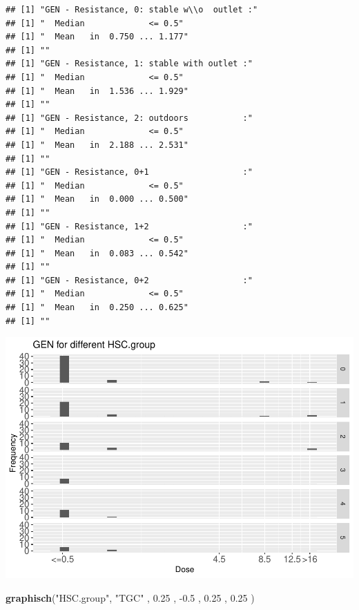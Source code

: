 \documentclass[
]{article}
\newenvironment{Shaded}{\begin{snugshade}}{\end{snugshade}}
\newcommand{\FloatTok}[1]{\textcolor[rgb]{0.00,0.00,0.81}{#1}}
\newcommand{\KeywordTok}[1]{\textcolor[rgb]{0.13,0.29,0.53}{\textbf{#1}}}
\newcommand{\NormalTok}[1]{#1}
\newcommand{\StringTok}[1]{\textcolor[rgb]{0.31,0.60,0.02}{#1}}
\begin{document}
\begin{verbatim}
## [1] "GEN - Resistance, 0: stable w\\o  outlet :"
## [1] "  Median             <= 0.5"
## [1] "  Mean   in  0.750 ... 1.177"
## [1] ""
## [1] "GEN - Resistance, 1: stable with outlet :"
## [1] "  Median             <= 0.5"
## [1] "  Mean   in  1.536 ... 1.929"
## [1] ""
## [1] "GEN - Resistance, 2: outdoors           :"
## [1] "  Median             <= 0.5"
## [1] "  Mean   in  2.188 ... 2.531"
## [1] ""
## [1] "GEN - Resistance, 0+1                   :"
## [1] "  Median             <= 0.5"
## [1] "  Mean   in  0.000 ... 0.500"
## [1] ""
## [1] "GEN - Resistance, 1+2                   :"
## [1] "  Median             <= 0.5"
## [1] "  Mean   in  0.083 ... 0.542"
## [1] ""
## [1] "GEN - Resistance, 0+2                   :"
## [1] "  Median             <= 0.5"
## [1] "  Mean   in  0.250 ... 0.625"
## [1] ""
\end{verbatim}

\includegraphics{Verteilungen_files/figure-latex/unnamed-chunk-48-1.pdf}

\begin{Shaded}
\begin{Highlighting}[]
   \KeywordTok{graphisch}\NormalTok{(}\StringTok{"HSC.group"}\NormalTok{, }\StringTok{"TGC"}\NormalTok{ , }\FloatTok{0.25}\NormalTok{ ,  }\FloatTok{-0.5}\NormalTok{ ,   }\FloatTok{0.25}\NormalTok{ ,   }\FloatTok{0.25}\NormalTok{ )  }
\end{Highlighting}
\end{Shaded}
\end{document}
